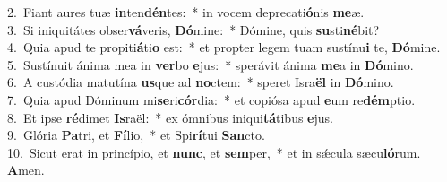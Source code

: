 {2.~}Fiant aures tuæ \textbf{in}ten\textbf{dén}tes:~* in vocem deprecati\textbf{ó}nis \textbf{me}æ.\\
{3.~}Si iniquitátes obser\textbf{vá}veris, \textbf{Dó}mine:~* Dómine, quis \textbf{su}sti\textbf{né}bit?\\
{4.~}Quia apud te propiti\textbf{á}ti\textbf{o} est:~* et propter legem tuam sustínu\textbf{i} te, \textbf{Dó}mine.\\
{5.~}Sustínuit ánima mea in \textbf{ver}bo \textbf{e}jus:~* sperávit ánima \textbf{me}a in \textbf{Dó}mino.\\
{6.~}A custódia matutína \textbf{us}que ad \textbf{no}ctem:~* speret Isra\textbf{ël} in \textbf{Dó}mino.\\
{7.~}Quia apud Dóminum mi\textbf{se}ri\textbf{cór}dia:~* et copiósa apud \textbf{e}um re\textbf{dém}ptio.\\
{8.~}Et ipse \textbf{ré}dimet \textbf{Is}raël:~* ex ómnibus iniqui\textbf{tá}tibus \textbf{e}jus.\\
{9.~}Glória \textbf{Pa}tri, et \textbf{Fí}lio,~* et Spi\textbf{rí}tui \textbf{San}cto.\\
{10.~}Sicut erat in princípio, et \textbf{nunc}, et \textbf{sem}per,~* et in sǽcula sæcu\textbf{ló}rum. \textbf{A}men.\\
